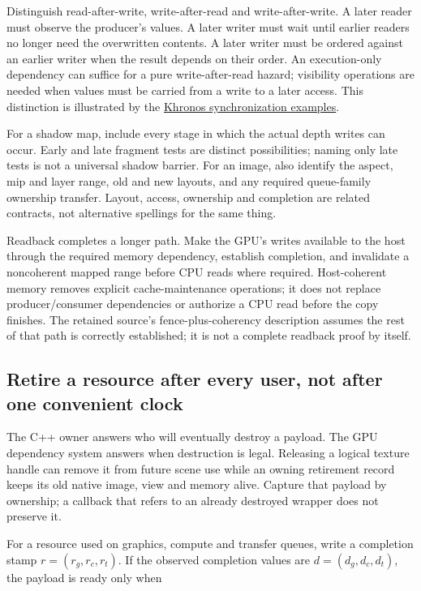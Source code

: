 Distinguish read-after-write, write-after-read and write-after-write. A later reader must observe the producer's values. A later writer must wait until earlier readers no longer need the overwritten contents. A later writer must be ordered against an earlier writer when the result depends on their order. An execution-only dependency can suffice for a pure write-after-read hazard; visibility operations are needed when values must be carried from a write to a later access. This distinction is illustrated by the \href{https://docs.vulkan.org/guide/latest/synchronization_examples.html}{Khronos synchronization examples}.

For a shadow map, include every stage in which the actual depth writes can occur. Early and late fragment tests are distinct possibilities; naming only late tests is not a universal shadow barrier. For an image, also identify the aspect, mip and layer range, old and new layouts, and any required queue-family ownership transfer. Layout, access, ownership and completion are related contracts, not alternative spellings for the same thing.

Readback completes a longer path. Make the GPU's writes available to the host through the required memory dependency, establish completion, and invalidate a noncoherent mapped range before CPU reads where required. Host-coherent memory removes explicit cache-maintenance operations; it does not replace producer/consumer dependencies or authorize a CPU read before the copy finishes. The retained source's fence-plus-coherency description assumes the rest of that path is correctly established; it is not a complete readback proof by itself.

\subsection{Retire a resource after every user, not after one convenient clock}\label{05-engine-i-ch019-retire-a-resource-after-every-user-not-after-one-convenient-clock}

The C++ owner answers who will eventually destroy a payload. The GPU dependency system answers when destruction is legal. Releasing a logical texture handle can remove it from future scene use while an owning retirement record keeps its old native image, view and memory alive. Capture that payload by ownership; a callback that refers to an already destroyed wrapper does not preserve it.

For a resource used on graphics, compute and transfer queues, write a completion stamp \(r=(r_g,r_c,r_t)\). If the observed completion values are \(d=(d_g,d_c,d_t)\), the payload is ready only when

